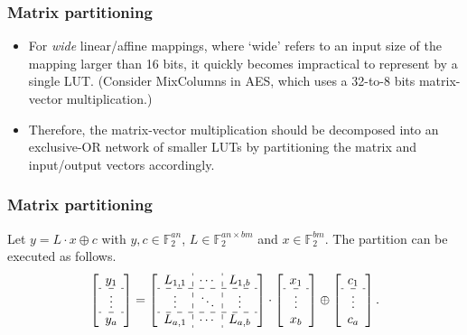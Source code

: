 \documentclass{beamer}
\begin{document}
\frame
{
\frametitle{Matrix partitioning}
\begin{itemize}
\item For \textit{wide} linear/affine mappings, where `wide' refers to an input size of the mapping larger than 16 bits, it quickly becomes impractical to represent by a single LUT. (Consider MixColumns in AES, which uses a 32-to-8 bits matrix-vector multiplication.)

\item Therefore, the matrix-vector multiplication should be decomposed into an exclusive-OR network of smaller LUTs by partitioning the matrix and input/output vectors accordingly.
\end{itemize}

}

\frame
{
\frametitle{Matrix partitioning}
Let $y = L \cdot x \oplus c$ with $y, c \in \mathbb{F}^{an}_{2}$, $L \in \mathbb{F}^{an\times bm}_{2}$ and $x \in \mathbb{F}^{bm}_{2}$. The partition can be executed as follows.
\[
    \begin{bmatrix} %
    \begin{array}{c}
      y_{1}  \\ 
      \hdashline
      \vdots \\
      \hdashline
      y_{a} \\
      \end{array}
   \end{bmatrix} = 
   \begin{bmatrix}%
   \begin{array}{c : c : c}
      L_{1, 1} & \cdots & L_{1, b}  \\ 
      \hdashline
      \vdots & \ddots & \vdots \\
      \hdashline
      L_{a, 1} & \cdots & L_{a, b} \\
      \end{array}
   \end{bmatrix} 
   \cdot 
   \begin{bmatrix}%
   \begin{array}{c}
   x_{1} \\
   \hdashline
   \vdots \\
   x_{b} \\
   \end{array}
   \end{bmatrix}
   \oplus
      \begin{bmatrix}%
   \begin{array}{c}
   c_{1} \\
   \hdashline
   \vdots \\
   c_{a} \\
   \end{array}
   \end{bmatrix}
.\]

}
\end{document}
